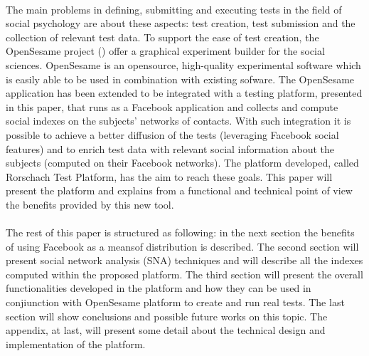 \\
The main problems in deﬁning, submitting and executing tests in the ﬁeld of social psychology are about these aspects: test creation, test submission and the collection
of relevant test data.
To support the ease of test creation, the OpenSesame project (\cite{Matot-2011}) offer a graphical experiment builder for the social sciences.
OpenSesame is an opensource, high-quality experimental software which is easily able to be used in combination with existing sofware.
The OpenSesame application has been extended to be integrated with a testing platform, presented in this paper, that runs as a Facebook application and collects and compute
social indexes on the subjects’ networks of contacts.
With such integration it is possible to achieve a better diffusion of the tests (leveraging Facebook social features) and to enrich test data with relevant social
information about the subjects (computed on their Facebook networks).
The platform developed, called Rorschach Test Platform, has the aim to reach these goals.
This paper will present the platform and explains from a functional and technical point of view the beneﬁts provided by this new tool.\\
\\
The rest of this paper is structured as following: in the next section the beneﬁts of using Facebook as a meansof distribution is described.
The second section will present social network analysis (SNA) techniques and will describe all the indexes computed within the proposed platform.
The third section will present the overall functionalities developed in the platform and how they can be used in conjiunction with OpenSesame platform to create and run
real tests.
The last section will show conclusions and possible future works on this topic.
The appendix, at last, will present some detail about the technical design and implementation of the platform.

